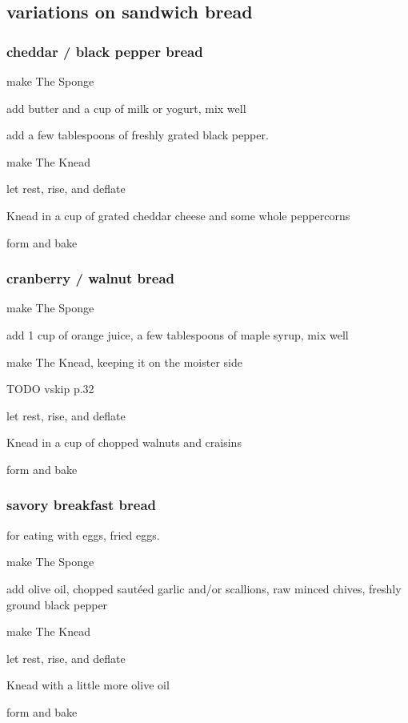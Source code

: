 \subsection{variations on sandwich bread}

\subsubsection{cheddar / black pepper bread}

\begin{algorithm}
  \item make The Sponge
  \item add butter and a cup of milk or yogurt, mix well
  \item add a few tablespoons of freshly grated black pepper.
  \item make The Knead
  \item let rest, rise, and deflate
  \item Knead in a cup of grated cheddar cheese and some whole peppercorns
  \item form and bake
\end{algorithm}

\subsubsection{cranberry / walnut bread}

\begin{algorithm}
  \item make The Sponge
  \item add 1 cup of orange juice, a few tablespoons of maple syrup, mix well
  \item make The Knead, keeping it on the moister side

  TODO vskip p.32

  \item let rest, rise, and deflate
  \item Knead in a cup of chopped walnuts and craisins
  \item form and bake
\end{algorithm}

\subsubsection{savory breakfast bread}

for eating with eggs, fried eggs.

\begin{algorithm}
  \item make The Sponge
  \item add olive oil, chopped saut\'{e}ed garlic and/or scallions, raw minced chives, freshly ground black pepper 
  \item make The Knead
  \item let rest, rise, and deflate
  \item Knead with a little more olive oil
  \item form and bake
\end{algorithm}

